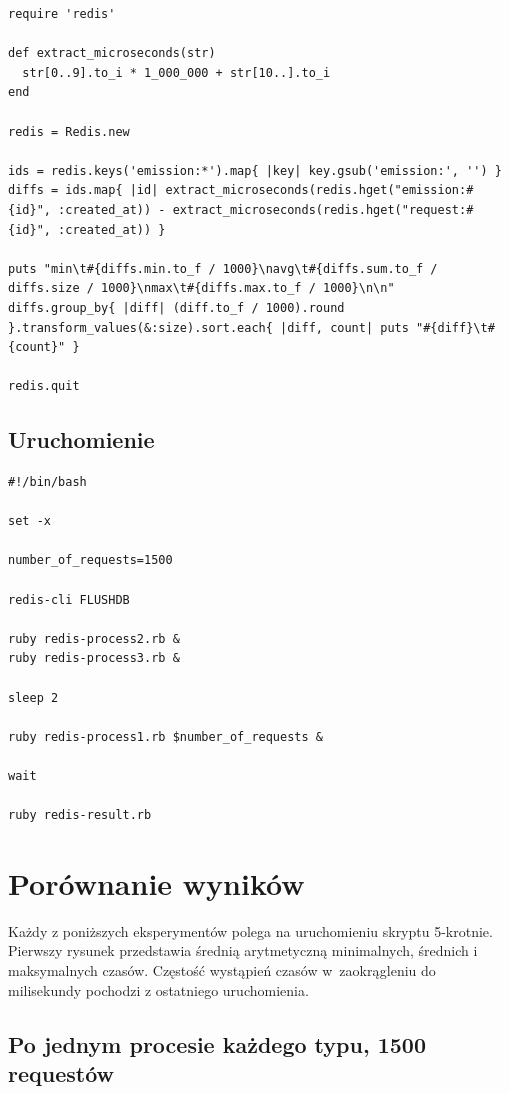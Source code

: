 \documentclass[a4paper,11pt]{article}
\begin{document}
\begin{lstlisting}
require 'redis'

def extract_microseconds(str)
  str[0..9].to_i * 1_000_000 + str[10..].to_i
end

redis = Redis.new

ids = redis.keys('emission:*').map{ |key| key.gsub('emission:', '') }
diffs = ids.map{ |id| extract_microseconds(redis.hget("emission:#{id}", :created_at)) - extract_microseconds(redis.hget("request:#{id}", :created_at)) }

puts "min\t#{diffs.min.to_f / 1000}\navg\t#{diffs.sum.to_f / diffs.size / 1000}\nmax\t#{diffs.max.to_f / 1000}\n\n"
diffs.group_by{ |diff| (diff.to_f / 1000).round }.transform_values(&:size).sort.each{ |diff, count| puts "#{diff}\t#{count}" }

redis.quit
\end{lstlisting}


\subsection{Uruchomienie}

\begin{lstlisting}
#!/bin/bash

set -x

number_of_requests=1500

redis-cli FLUSHDB

ruby redis-process2.rb &
ruby redis-process3.rb &

sleep 2

ruby redis-process1.rb $number_of_requests &

wait

ruby redis-result.rb
\end{lstlisting}


\section{Porównanie wyników}

Każdy z poniższych eksperymentów polega na uruchomieniu skryptu 5-krotnie. Pierwszy rysunek przedstawia średnią arytmetyczną
minimalnych, średnich i maksymalnych czasów. Częstość wystąpień czasów w~zaokrągleniu do milisekundy pochodzi z ostatniego uruchomienia.


\subsection{Po jednym procesie każdego typu, 1500 requestów}
\end{document}
